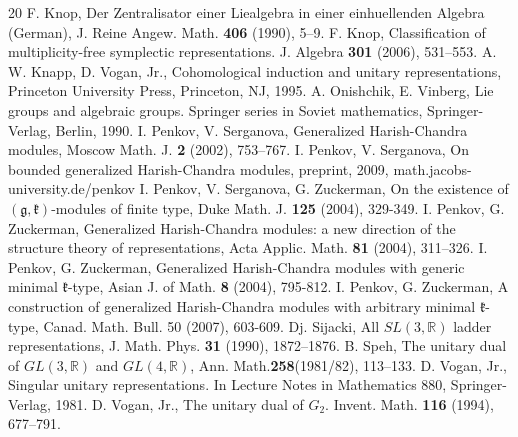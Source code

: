 \documentclass[12pt]{amsart}
\theoremstyle{plain} %
\newcommand{\kk}{\mathfrak{k}}
\renewcommand{\gg}{\mathfrak{g}}
\newcommand {\gkm} {$(\gg,\kk)$-module}
\begin{document}
\begin{thebibliography}{20}
 F. Knop, Der Zentralisator einer Liealgebra in
einer einhuellenden Algebra (German), J. Reine Angew. Math.  \textbf{406} (1990), 5--9.
 F. Knop, Classification of multiplicity-free symplectic  representations.  J. Algebra  \textbf{301} (2006), 531--553.
 A. W. Knapp, D. Vogan, Jr., Cohomological induction and unitary representations, Princeton University Press, Princeton, NJ, 1995.
 A. Onishchik, E. Vinberg, Lie groups and algebraic
  groups. Springer series in Soviet mathematics, Springer-Verlag,
  Berlin, 1990.
 I. Penkov, V. Serganova, Generalized Harish-Chandra modules, Moscow Math. J. \textbf{2} (2002), 753--767.
 I. Penkov, V. Serganova, On bounded generalized Harish-Chandra modules, preprint, 2009, math.jacobs-university.de/penkov
 I. Penkov, V. Serganova, G. Zuckerman, On the existence of \gkm s of finite type, Duke Math. J. \textbf{125} (2004), 329-349.
 I. Penkov, G. Zuckerman, Generalized Harish-Chandra modules: a new direction of the structure theory of representations, Acta Applic. Math. \textbf{81} (2004), 311--326.
 I. Penkov, G. Zuckerman, Generalized Harish-Chandra modules with generic minimal $\kk$-type, Asian J. of Math. \textbf{8} (2004), 795-812.
 I. Penkov, G. Zuckerman, A construction of generalized Harish-Chandra  modules with arbitrary minimal $\kk$-type, Canad. Math. Bull. 50 (2007), 603-609.
 Dj. Sijacki, All $SL(3,\mathbb R)$ ladder
  representations, J. Math. Phys. \textbf{31} (1990), 1872--1876.
 B. Speh, The unitary dual of $GL(3,\mathbb R)$ and
  $GL(4,\mathbb R)$, Ann. Math.\textbf{258}(1981/82), 113--133.  
 D. Vogan, Jr., Singular unitary representations. In Lecture Notes in Mathematics 880, Springer-Verlag, 1981.
 D. Vogan, Jr., The unitary dual of
  $G_2$. Invent. Math. \textbf{116} (1994), 677--791.


\end{thebibliography}
\end{document}
